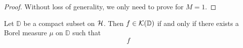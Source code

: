 \begin{proof}
    Without loss of generality, we only need to prove for $M = 1$.
\end{proof}


\begin{lemma}
    Let $\mathbb{D}$ be a compact subset on $\mathcal{H}$. Then $f \in
    \mathcal{K}({\mathbb{D}})$ if and only if there exists a Borel measure $\mu$ on
    $\mathbb{D}$ such that
    \begin{equation}
        f 
    \end{equation}
\end{lemma}

